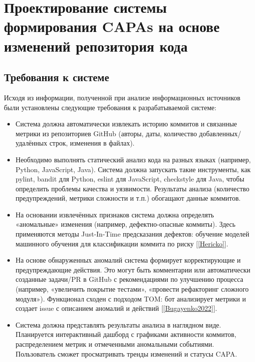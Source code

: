 \chapter{Проектирование системы формирования CAPAs на основе изменений репозитория кода} \label{ch2}

\section{Требования к системе} \label{ch2:method_selection}

Исходя из информации, полученной при анализе информационных источников были установлены следующие требования к разрабатываемой системе:

\begin{itemize}
	\item Система должна автоматически извлекать историю коммитов и связанные метрики из репозиториев GitHub (авторы, даты, количество добавленных/удалённых строк, изменения в файлах).
	\item Необходимо выполнять статический анализ кода на разных языках (например, Python, JavaScript, Java). Система должна запускать такие инструменты, как pylint, bandit для Python, eslint для JavaScript, checkstyle для Java, чтобы определить проблемы качества и уязвимости. Результаты анализа (количество предупреждений, метрики сложности и т.п.) обогащают данные коммитов.
	\item  На основании извлечённых признаков система должна определять «аномальные» изменения (например, дефектно-опасные коммиты). Здесь применяются методы Just-In-Time предсказания дефектов: обучение моделей машинного обучения для классификации коммита по риску [\ref{Hericko}].
	\item На основе обнаруженных аномалий система формирует корректирующие и предупреждающие действия. Это могут быть комментарии или автоматически созданные задачи/PR в GitHub с рекомендациями по улучшению процесса (например, «увеличить покрытие тестами», «провести рефакторинг сложного модуля»). Функционал сходен с подходом TOM: бот анализирует метрики и создает issue с описанием аномалий и действий [\ref{Bugayenko2022}].
	\item Система должна представлять результаты анализа в наглядном виде. Планируется интерактивный дашборд с графиками активности коммитов, распределением метрик и отмеченными аномальными событиями. Пользователь сможет просматривать тренды изменений и статусы CAPA.
\end{itemize}

